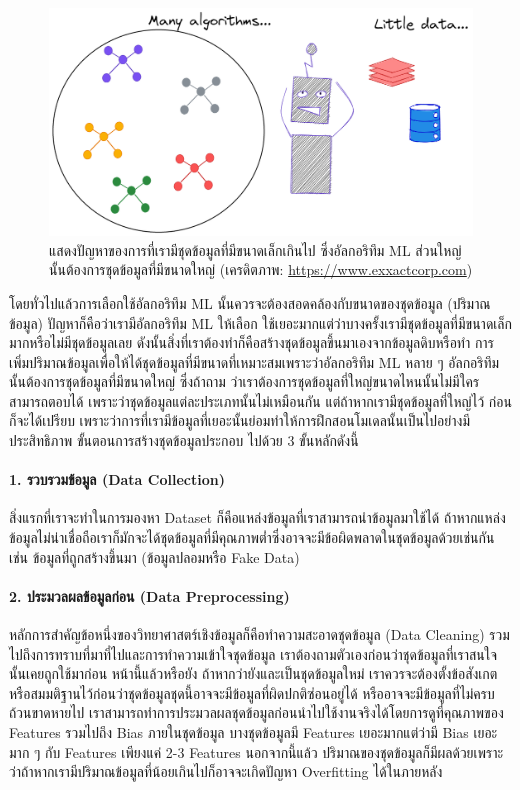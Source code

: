 \begin{figure}[htbp]
    \centering
    \includegraphics[width=0.8\linewidth]{fig/many_ml_little_dataset.png}
    \caption{แสดงปัญหาของการที่เรามีชุดข้อมูลที่มีขนาดเล็กเกินไป ซึ่งอัลกอริทึม ML ส่วนใหญ่นั้นต้องการชุดข้อมูลที่มีขนาดใหญ่ 
    (เครดิตภาพ: \url{https://www.exxactcorp.com})}
    \label{fig:many_ml_little_dataset}
\end{figure}

โดยทั่วไปแล้วการเลือกใช้อัลกอริทึม ML นั้นควรจะต้องสอดคล้องกับขนาดของชุดข้อมูล (ปริมาณข้อมูล) ปัญหาก็คือว่าเรามีอัลกอริทึม ML ให้เลือก%
ใช้เยอะมากแต่ว่าบางครั้งเรามีชุดข้อมูลที่มีขนาดเล็กมากหรือไม่มีชุดข้อมูลเลย ดังนั้นสิ่งที่เราต้องทำก็คือสร้างชุดข้อมูลขึ้นมาเองจากข้อมูลดิบหรือทำ%
การเพิ่มปริมาณข้อมูลเพื่อให้ได้ชุดข้อมูลที่มีขนาดที่เหมาะสมเพราะว่าอัลกอริทึม ML หลาย ๆ อัลกอริทึมนั้นต้องการชุดข้อมูลที่มีขนาดใหญ่ ซึ่งถ้าถาม%
ว่าเราต้องการชุดข้อมูลที่ใหญ่ขนาดไหนนั้นไม่มีใครสามารถตอบได้ เพราะว่าชุดข้อมูลแต่ละประเภทนั้นไม่เหมือนกัน แต่ถ้าหากเรามีชุดข้อมูลที่ใหญ่ไว้%
ก่อนก็จะได้เปรียบ เพราะว่าการที่เรามีข้อมูลที่เยอะนั้นย่อมทำให้การฝึกสอนโมเดลนั้นเป็นไปอย่างมีประสิทธิภาพ ขั้นตอนการสร้างชุดข้อมูลประกอบ%
ไปด้วย 3 ขั้นหลักดังนี้

\paragraph{1. รวบรวมข้อมูล (Data Collection)} สิ่งแรกที่เราจะทำในการมองหา Dataset ก็คือแหล่งข้อมูลที่เราสามารถนำข้อมูลมาใช้ได้ 
ถ้าหากแหล่งข้อมูลไม่น่าเชื่อถือเราก็มักจะได้ชุดข้อมูลที่มีคุณภาพต่ำซึ่งอาจจะมีข้อผิดพลาดในชุดข้อมูลด้วยเช่นกัน เช่น ข้อมูลที่ถูกสร้างขึ้นมา 
(ข้อมูลปลอมหรือ Fake Data) 

\paragraph{2. ประมวลผลข้อมูลก่อน (Data Preprocessing)} หลักการสำคัญข้อหนึ่งของวิทยาศาสตร์เชิงข้อมูลก็คือทำความสะอาดชุดข้อมูล 
(Data Cleaning) รวมไปถึงการทราบที่มาที่ไปและการทำความเข้าใจชุดข้อมูล เราต้องถามตัวเองก่อนว่าชุดข้อมูลที่เราสนใจนั้นเคยถูกใช้มาก่อน%
หน้านี้แล้วหรือยัง ถ้าหากว่ายังและเป็นชุดข้อมูลใหม่ เราควรจะต้องตั้งข้อสังเกตหรือสมมติฐานไว้ก่อนว่าชุดข้อมูลชุดนี้อาจจะมีข้อมูลที่ผิดปกติซ่อนอยู่ได้ 
หรืออาจจะมีข้อมูลที่ไม่ครบถ้วนขาดหายไป เราสามารถทำการประมวลผลชุดข้อมูลก่อนนำไปใช้งานจริงได้โดยการดูที่คุณภาพของ Features รวมไปถึง 
Bias ภายในชุดข้อมูล บางชุดข้อมูลมี Features เยอะมากแต่ว่ามี Bias เยอะมาก ๆ กับ Features เพียงแค่ 2-3 Features นอกจากนี้แล้ว%
ปริมาณของชุดข้อมูลก็มีผลด้วยเพราะว่าถ้าหากเรามีปริมาณข้อมูลที่น้อยเกินไปก็อาจจะเกิดปัญหา Overfitting ได้ในภายหลัง

